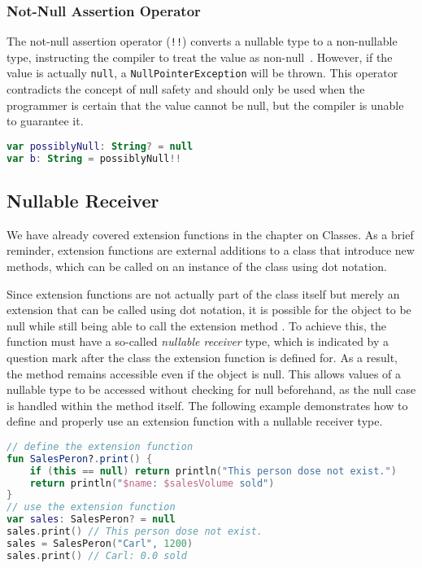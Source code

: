 \documentclass[a4paper,11pt]{article}
\begin{document}
\subsubsection{Not-Null Assertion Operator}
The not-null assertion operator (\texttt{!!}) converts a nullable type to a non-nullable type, instructing the compiler to treat the value as non-null~\cite{nullsafety-assertion}. However, if the value is actually \texttt{null}, a \texttt{NullPointerException} will be thrown.
This operator contradicts the concept of null safety and should only be used when the programmer is certain that the value cannot be null, but the compiler is unable to guarantee it.


\begin{lstlisting}[language=Kotlin, title={Usage of the not-null assertion}]
var possiblyNull: String? = null
var b: String = possiblyNull!!
\end{lstlisting}

\subsection{Nullable Receiver}
We have already covered extension functions in the chapter on Classes. As a brief reminder, extension functions are external additions to a class that introduce new methods, which can be called on an instance of the class using dot notation.

Since extension functions are not actually part of the class itself but merely an extension that can be called using dot notation, it is possible for the object to be null while still being able to call the extension method \cite{nullsafety-nullable-receiver}. To achieve this, the function must have a so-called \textit{nullable receiver} type, which is indicated by a question mark after the class the extension function is defined for. As a result, the method remains accessible even if the object is null. This allows values of a nullable type to be accessed without checking for null beforehand, as the null case is handled within the method itself. The following example demonstrates how to define and properly use an extension function with a nullable receiver type.
\begin{lstlisting}[language=Kotlin,title={Usage of an extension function}]
// define the extension function
fun SalesPeron?.print() {
    if (this == null) return println("This person dose not exist.")
    return println("$name: $salesVolume sold")
}
// use the extension function
var sales: SalesPeron? = null
sales.print() // This person dose not exist.
sales = SalesPeron("Carl", 1200)
sales.print() // Carl: 0.0 sold
\end{lstlisting}
\end{document}
